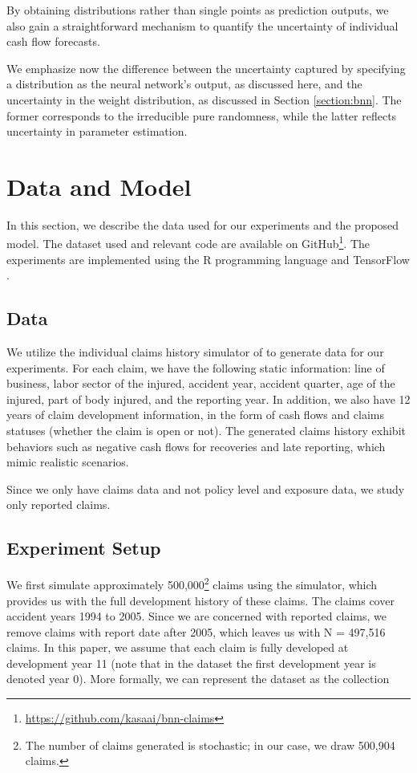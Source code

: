 \documentclass{article}
\begin{document}
By obtaining distributions rather than single points as prediction outputs, we also gain a straightforward mechanism to quantify the uncertainty of individual cash flow forecasts.

We emphasize now the difference between the uncertainty captured by specifying a distribution as the neural network's output, as discussed here, and the uncertainty in the weight distribution, as discussed in Section \ref{section:bnn}. The former corresponds to the irreducible pure randomness, while the latter reflects uncertainty in parameter estimation.

\section{Data and Model}

In this section, we describe the data used for our experiments and the proposed model. The dataset used and relevant code are available on GitHub\footnote{\url{https://github.com/kasaai/bnn-claims}}. The experiments are implemented using the R programming language \cite{r2018} and TensorFlow \cite{tensorflow2015-whitepaper}.

\subsection{Data}

We utilize the individual claims history simulator of \cite{gabrielli2018individual} to generate data for our experiments. For each claim, we have the following static information: line of business, labor sector of the injured, accident year, accident quarter, age of the injured, part of body injured, and the reporting year. In addition, we also have 12 years of claim development information, in the form of cash flows and claims statuses (whether the claim is open or not). The generated claims history exhibit behaviors such as negative cash flows for recoveries and late reporting, which mimic realistic scenarios.

Since we only have claims data and not policy level and exposure data, we study only reported claims.

\subsection{Experiment Setup}

We first simulate approximately 500,000\footnote{The number of claims generated is stochastic; in our case, we draw 500,904 claims.} claims using the simulator, which provides us with the full development history of these claims. The claims cover accident years 1994 to 2005. Since we are concerned with reported claims, we remove claims with report date after 2005, which leaves us with N = 497,516 claims. In this paper, we assume that each claim is fully developed at development year 11 (note that in the dataset the first development year is denoted year 0). More formally, we can represent the dataset as the collection
\end{document}
